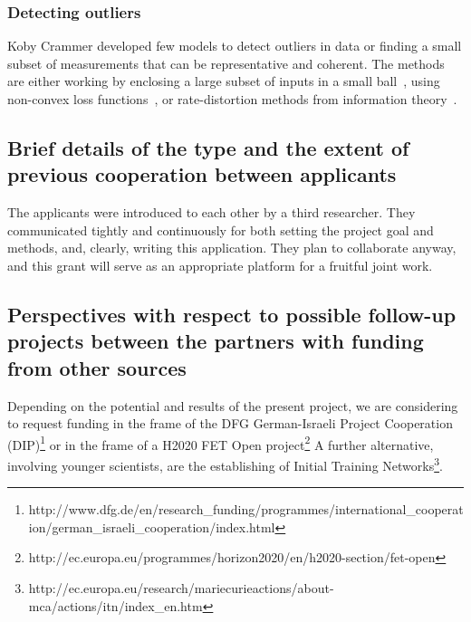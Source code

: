 \documentclass[12pt]{article}
\begin{document}
\subsubsection*{Detecting outliers}
Koby Crammer developed few models to detect outliers in data or finding a small subset of measurements that can be representative and coherent. The methods are either working by enclosing a large subset of inputs in a small ball~\cite{DBLP:conf/colt/CrammerS03}, using non-convex loss functions~\cite{CrammerCh04}, or rate-distortion methods from information theory~\cite{DBLP:conf/icml/CrammerTP08}.



\subsection*{Brief details of the type and the extent of previous cooperation between applicants}
The applicants were introduced to each other by a third researcher. They communicated tightly and continuously for both setting the project goal and methods, and, clearly, writing this application. They plan to collaborate anyway, and this grant will serve as an appropriate platform for a fruitful joint work.

\subsection*{Perspectives with respect to possible follow-up projects between the partners with funding from other sources}
Depending on the potential and results of the present project, we are considering to request funding in the frame of the DFG German-Israeli Project Cooperation (DIP)\footnote{http://www.dfg.de/en/research\_funding/programmes/international\_cooperation/german\_israeli\_cooperation/index.html} or in the frame of a H2020 FET Open project\footnote{http://ec.europa.eu/programmes/horizon2020/en/h2020-section/fet-open}
A further alternative, involving younger scientists, are the establishing of Initial Training Networks\footnote{http://ec.europa.eu/research/mariecurieactions/about-mca/actions/itn/index\_en.htm}.
\end{document}
